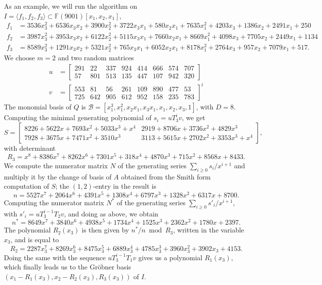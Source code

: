\documentclass[12pt]{article}
\begin{document}
As an example, we will run the algorithm on $I = \langle f_1, f_2, f_3 \rangle \subset \mathbb{F}(9001)[x_1,x_2,x_1]$,
\begin{align*}
f_1 &= 3536x_3^2 +6536x_3x_2 + 3900x_2^2 + 3722x_3x_1 + 580x_2x_1 + 7635x_1^2 + 4203x_3 + 1386x_2 + 2491x_1 + 250\\
f_2 &= 3987x_3^2 + 3953x_3x_2 +6122x_2^2 +5115x_3x_1 +7660x_2x_1 +8669x_1^2 + 4098x_3 +7705x_2 + 2449x_1 + 1134\\
f_3 &= 8589x_3^2 + 1291x_3x_2 +5321x_2^2 + 765x_3x_1 +6052x_2x_1 +8178x_1^2 + 2764x_3 + 957x_2 +7079x_1 + 517.
\end{align*}
We choose $m = 2$ and two random matrices
\begin{align*}
u &= \begin{bmatrix}
291&  22& 337& 924& 414& 666& 574& 707\\
57& 801& 513& 135& 447& 107& 942& 320
\end{bmatrix}\\
v &= \begin{bmatrix}
553&  81&  56& 261& 109& 890& 477&  53\\
725& 642& 905& 612& 952& 158& 235& 783
\end{bmatrix} ^ {t}
\end{align*}
The monomial basis of $Q$ is $\mathscr{B}=[x_1^3, x_1^2, x_2x_1, x_3x_1, x_1, x_2, x_3, 1]$, with $D = 8$. 
Computing the minimal generating polynomial of $s_i=u T_3^i v$, we get
$$S= \begin{bmatrix}
8226 + 5622x + 7693x^2 + 5033x^3 + x^4&     2919 + 8706x + 3736x^2 + 4829x^3\\
7928 + 3675x + 7471x^2 + 3510x^3  &        3113 + 5615x + 2702x^2 + 3353x^3 + x^4
\end{bmatrix},$$
with determinant
$$R_3 =x^8 + 8386x^7 + 8262x^6 + 7301x^5 + 318x^4 + 4870x^3 + 715x^2 + 8568x + 8433.$$
We compute the numerator matrix $N$ of the generating series $\sum_{i \ge 0} s_i/x^{i+1}$
and multiply it by the change of basis of $A$ obtained from the Smith form computation of 
$S$; the $(1,2)$-entry in the result is
$$n = 5527x^7 + 2064x^6 + 4391x^5 + 1308x^4 + 6797x^3 + 1328x^2 + 6317x + 8700.$$
Computing the numerator matrix $N^*$ of the generating series $\sum_{i \ge 0} s'_i/x^{i+1}$,
with $s'_i = uT_3^{i-1} T_2 v$, and doing as above, we obtain
$$n^* = 8649x^7 + 3840x^6 + 4938x^5 + 1734x^4 + 1525x^3 + 2362x^2 + 1780x + 2397.$$
The polynomial $R_2(x_3)$ is then given by $n^*/n \bmod R_3$, written in the variable
$x_3$, and
is equal to 
$$R_2 = 2287x_3^7 + 8269x_3^6 + 8475x_3^5 + 6889x_3^4 + 4785x_3^3 + 3960x_3^2 + 3902x_3 + 4153.$$
Doing the same with the sequence $uT_3^{i-1} T_1 v$ gives us a polynomial $R_1(x_3)$,
which finally leads us to the Gr\"obner basis $(x_1-R_1(x_3), x_2-R_2(x_3),R_3(x_3))$
of $I$.
\end{document}
